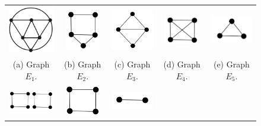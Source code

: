  \begin{figure}[htb]	
 
   \centering
  \begin{tabular}{  c c c c  c}
    \includegraphics[width=2cm]{img/octaedroNoLabel.png} 
    & 
    \includegraphics[width=1.5cm]{img/ex3.png} 
    & 
    \includegraphics[width=2cm]{img/diamondNoLabel.png} 
    & 
    \includegraphics[width=1.5cm]{img/k4.png} 
    & 
    \includegraphics[width=2cm]{img/k3.png} 
    \\
    \footnotesize 
    (a)  \footnotesize Graph $E_1$. 
    & 
    \footnotesize (b) Graph $E_2$.
    & 
    \footnotesize (c) Graph $E_3$.
    & 
    \footnotesize (d) Graph $E_4$.
    & 
    \footnotesize (e) Graph $E_5$.
    \\%
        \includegraphics[width=2.5cm]{img/2c4.png} 
    & 
    \includegraphics[width=1.5cm]{img/c4e.png} 
    & 
    \includegraphics[width=1.8cm]{img/k2.png} 

\end{tabular}
\end{figure}
